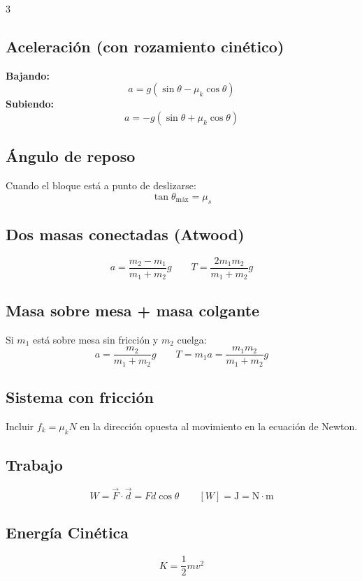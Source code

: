 \documentclass[10pt,landscape]{article}
\begin{document}
\begin{multicols}{3}
\subsection*{Aceleraci\'{o}n (con rozamiento cin\'{e}tico)}
\textbf{Bajando:}
\[
\boxed{a = g(\sin\theta - \mu_k \cos\theta)}
\]
\textbf{Subiendo:}
\[
\boxed{a = -g(\sin\theta + \mu_k \cos\theta)}
\]

\subsection*{\'{A}ngulo de reposo}
Cuando el bloque est\'{a} a punto de deslizarse:
\[
\boxed{\tan\theta_{\text{m\'{a}x}} = \mu_s}
\]

\vspace{4pt}

\subsection*{Dos masas conectadas (Atwood)}
\[
a = \frac{m_2 - m_1}{m_1 + m_2}g \qquad T = \frac{2m_1 m_2}{m_1 + m_2}g
\]

\subsection*{Masa sobre mesa + masa colgante}
Si $m_1$ est\'{a} sobre mesa sin fricci\'{o}n y $m_2$ cuelga:
\[
a = \frac{m_2}{m_1 + m_2}g \qquad T = m_1 a = \frac{m_1 m_2}{m_1 + m_2}g
\]

\subsection*{Sistema con fricci\'{o}n}
Incluir $f_k = \mu_k N$ en la direcci\'{o}n opuesta al movimiento en la ecuaci\'{o}n de Newton.



\subsection*{Trabajo}
\[
\boxed{W = \vec{F} \cdot \vec{d} = Fd\cos\theta} \qquad [W] = \text{J} = \text{N}\cdot\text{m}
\]

\subsection*{Energ\'{i}a Cin\'{e}tica}
\[
\boxed{K = \frac{1}{2}mv^2}
\]


\end{multicols}
\end{document}
